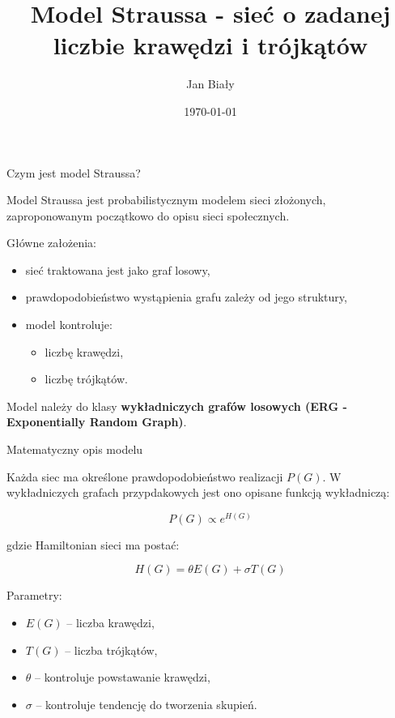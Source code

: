 \documentclass{beamer}
\title{Model Straussa - sieć o zadanej liczbie krawędzi i trójkątów}
\author{Jan Biały}
\institute{Politechnika Warszawska}
\date{\today}
\begin{document}

\begin{frame}
\titlepage
\end{frame}


\begin{frame}{Czym jest model Straussa?}

Model Straussa jest probabilistycznym modelem sieci złożonych, zaproponowanym początkowo do opisu sieci społecznych.

\vspace{0.5cm}

Główne założenia:

\begin{itemize}
    \item sieć traktowana jest jako graf losowy,
    \item prawdopodobieństwo wystąpienia grafu zależy od jego struktury,
    \item model kontroluje:
    \begin{itemize}
        \item liczbę krawędzi,
        \item liczbę trójkątów.
    \end{itemize}
\end{itemize}

\vspace{0.4cm}

Model należy do klasy \textbf{wykładniczych grafów losowych (ERG - Exponentially Random Graph)}.

\end{frame}


\begin{frame}{Matematyczny opis modelu}

Każda siec ma określone prawdopodobieństwo realizacji $P(G)$. W wykładniczych grafach przypdakowych jest ono opisane funkcją wykładniczą:

\[
P(G)\propto e^{H(G)}
\]

gdzie Hamiltonian sieci ma postać:

\[
H(G)=\theta E(G)+\sigma T(G)
\]

Parametry:

\begin{itemize}
    \item $E(G)$ -- liczba krawędzi,
    \item $T(G)$ -- liczba trójkątów,
    \item $\theta$ -- kontroluje powstawanie krawędzi,
    \item $\sigma$ -- kontroluje tendencję do tworzenia skupień.
\end{itemize}

\end{frame}
\end{document}
